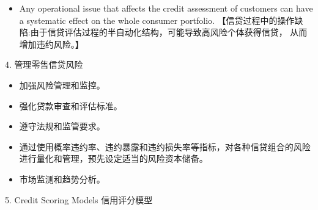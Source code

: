 \begin{itemize}
\item Any operational issue that affects the credit assessment of customers can have a systematic effect on the whole consumer portfolio. 【信贷过程中的操作缺陷:由于信贷评估过程的半自动化结构，可能导致高风险个体获得信贷， 从而增加违约风险。】
\end{itemize}

4. 管理零售信贷风险

\begin{itemize}
\item 加强风险管理和监控。
\end{itemize}

\begin{itemize}
\item 强化贷款审查和评估标准。
\end{itemize}

\begin{itemize}
\item 遵守法规和监管要求。
\end{itemize}

\begin{itemize}
\item 通过使用概率违约率、违约暴露和违约损失率等指标，对各种信贷组合的风险进行量化和管理，预先设定适当的风险资本储备。
\end{itemize}

\begin{itemize}
\item 市场监测和趋势分析。
\end{itemize}

5. Credit Scoring Models 信用评分模型

